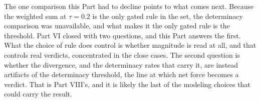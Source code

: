 The one comparison this Part had to decline points to what comes next.
Because the weighted sum at $\tau = 0.2$ is the only gated rule in the set,
the determinacy comparison was unavailable, and what makes it the only
gated rule is the threshold. Part VI closed with two questions, and
this Part answers the first. What the choice of rule does control is
whether magnitude is read at all, and that controls real verdicts,
concentrated in the close cases. The second question is whether the
divergence, and the determinacy rates that carry it, are instead
artifacts of the determinacy threshold, the line at which net force
becomes a verdict. That is Part VIII's, and it is likely the last of the modeling choices that
could carry the result.
